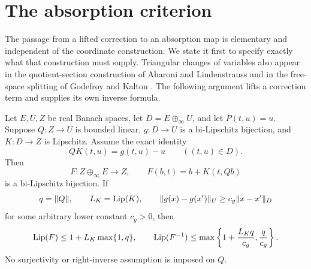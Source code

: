 \section{The absorption criterion}\label{sec:absorption}

The passage from a lifted correction to an absorption map is elementary
and independent of the coordinate construction. We state it first to
specify exactly what that construction must supply.
Triangular changes of variables also appear in the quotient-section
construction of Aharoni and Lindenstrauss \cite[pp.~281--282]{AL78} and in the
free-space splitting of Godefroy and Kalton \cite[Theorem~2.12]{GK03}.
The following argument lifts a correction term and supplies its own
inverse formula.

\begin{lemma}\label{lem:absorption}
Let \(E,U,Z\) be real Banach spaces, let
\(D=E\oplus_\infty U\), and let \(P(t,u)=u\). Suppose
\(Q:Z\to U\) is bounded linear,
\(g:D\to U\) is a bi-Lipschitz bijection, and \(K:D\to Z\) is
Lipschitz. Assume the exact identity
\begin{equation}
                 QK(t,u)=g(t,u)-u
                 \qquad ((t,u)\in D).                    \label{eq:absorb-identity}
\end{equation}
Then
\[
 F:Z\oplus_\infty E\longrightarrow Z,\qquad
 F(b,t)=b+K(t,Qb)
\]
is a bi-Lipschitz bijection. If
\[
 q=\|Q\|,\qquad L_K=\operatorname{Lip}(K),\qquad
 \|g(x)-g(x')\|_U\geq c_g\|x-x'\|_D
\]
for some arbitrary lower constant \(c_g>0\), then
\begin{equation}
 \operatorname{Lip}(F)\leq 1+L_K\max\{1,q\},\qquad
 \operatorname{Lip}(F^{-1})\leq
 \max\left\{1+\frac{L_Kq}{c_g},\frac{q}{c_g}\right\}.     \label{eq:absorb-bounds}
\end{equation}
No surjectivity or right-inverse assumption is imposed on \(Q\).
\end{lemma}


